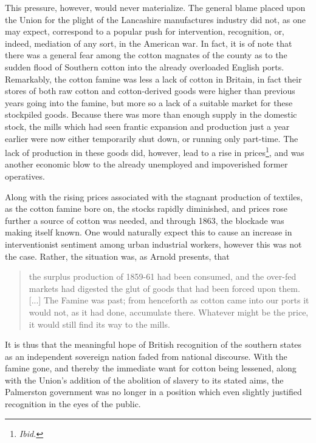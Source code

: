 This pressure, however, would never materialize. The general blame placed upon the Union for the plight of the Lancashire manufactures industry did not,
as one may expect, correspond to a popular push for intervention, recognition, or, indeed, mediation of any sort, in the American war. In fact, it is
of note that there was a general fear among the cotton magnates of the county as to the sudden flood of Southern cotton into the already overloaded 
English ports\Autocite[Vol.II, p.11]{adamsBritainAmericanWar1925}. Remarkably, the cotton famine was less a lack of cotton in Britain, in fact their 
stores of both raw cotton and cotton-derived goods were higher than previous years going into the famine, but more so a lack of a suitable market
for these stockpiled goods. Because there was more than enough supply in the domestic stock, the mills which had seen frantic expansion and production
just a year earlier were now either temporarily shut down, or running only part-time. The lack of production in these goods did, however, lead to a
rise in prices\footnote{\textit{Ibid.}}, and was another economic blow to the already unemployed and impoverished former operatives.

Along with the rising prices associated with the stagnant production of textiles, as the cotton famine bore on, the stocks rapidly diminished, and
prices rose further \textemdash a source of cotton was needed, and through 1863, the blockade was making itself known. One would naturally expect this 
to cause  an increase in interventionist sentiment among urban industrial workers, however this was not the case\autocite{steeleOntologicalSecurity2005}.
Rather, the situation was, as Arnold presents, that
\begin{quote}
    the surplus production of 1859-61 had been consumed, and the over-fed markets had digested the glut of goods that had been forced upon them. [...]
    The Famine was past; from henceforth as cotton came into our ports it would not, as it had done, accumulate there. Whatever might be the
    price, it would still find its way to the mills. \Autocite[331]{arnoldHistoryCotton1864}
\end{quote}
It is thus that the meaningful hope of British recognition of the southern states as an independent sovereign nation faded from national discourse. With
the famine gone, and thereby the immediate want for cotton being lessened, along with the Union's addition of the abolition of slavery to its stated 
aims, the Palmerston government was no longer in a position which even slightly justified recognition in the eyes of the public\Autocite{steeleOntologicalSecurity2005}.

